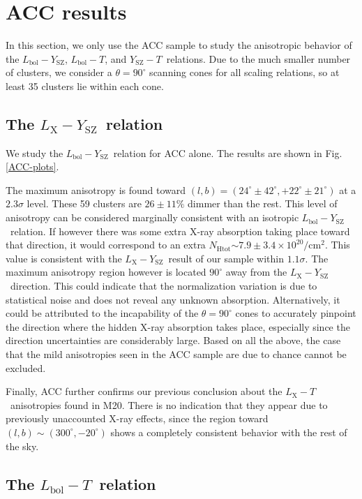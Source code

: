 \documentclass{aa}   %
\newcommand{\LT}{$L_{\text{X}}-T$}
\newcommand{\YT}{$Y_{\text{SZ}}-T$}
\newcommand{\LY}{$L_{\text{X}}-Y_{\text{SZ}}$}
\newcommand{\nhtot}{$N_{\text{Htot}}$}
\newcommand{\LbolT}{$L_{\text{bol}}-T$}
\newcommand{\LbolY}{$L_{\text{bol}}-Y_{\text{SZ}}$}
\begin{document}
\section{ACC results}\label{acc_results}

In this section, we only use the ACC sample to study the anisotropic behavior of the \LbolY, \LbolT, and \YT\ relations. Due to the much smaller number of clusters, we consider a $\theta=90^{\circ}$ scanning cones for all scaling relations, so at least 35 clusters lie within each cone. 

\subsection{The \LY\ relation}

We study the \LbolY\ relation for ACC alone. The results are shown in Fig. \ref{ACC-plots}. 

The maximum anisotropy is found toward $(l,b)=(24^{\circ}\pm 42^{\circ} ,+22^{\circ}\pm 21^{\circ} )$ at a $2.3\sigma$ level. These 59 clusters are $26\pm 11\%$ dimmer than the rest. This level of anisotropy can be considered marginally consistent with an isotropic \LbolY\ relation. If however there was some extra X-ray absorption taking place toward that direction, it would correspond to an extra \nhtot$\sim 7.9\pm 3.4\times 10^{20}/$cm$^2$. This value is consistent with the \LY\ result of our sample within $1.1\sigma$. The maximum anisotropy region however is located $90^{\circ}$ away from the \LY\ direction. This could indicate that the normalization variation is due to statistical noise and does not reveal any unknown absorption. Alternatively, it could be attributed to the incapability of the $\theta=90^{\circ}$ cones to accurately pinpoint the direction where the hidden X-ray absorption takes place, especially since the direction uncertainties are considerably large. Based on all the above, the case that the mild anisotropies seen in the ACC sample are due to chance cannot be excluded. 

Finally, ACC further confirms our previous conclusion about the \LT\ anisotropies found in M20. There is no indication that they appear due to previously unaccounted X-ray effects, since the region toward $(l,b)\sim (300^{\circ},-20^{\circ})$ shows a completely consistent behavior with the rest of the sky.

\subsection{The \LbolT\ relation}\label{acc-LT}
\end{document}
